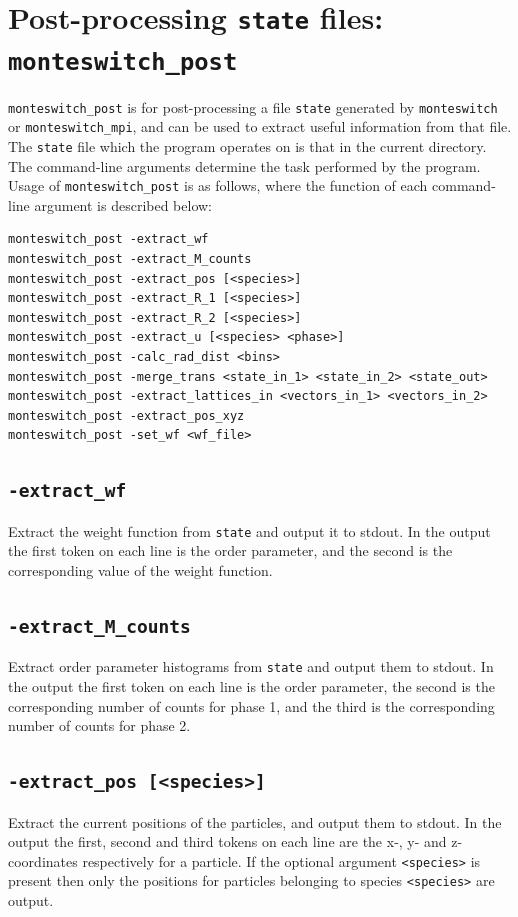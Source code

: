 \documentclass{report}
\begin{document}
\section{Post-processing \texttt{state} files: \texttt{monteswitch\_post}}\label{sec:monteswitch_post}
\texttt{monteswitch\_post} is for post-processing a file \texttt{state} generated by \texttt{monteswitch} or \texttt{monteswitch\_mpi}, and can
be used to extract useful information from that file. The \texttt{state} file which the program operates on is that in the current directory.
The command-line arguments determine the task performed by the program. Usage of \texttt{monteswitch\_post} is as follows, where the function 
of each command-line argument is described below:
\begin{verbatim}
monteswitch_post -extract_wf
monteswitch_post -extract_M_counts
monteswitch_post -extract_pos [<species>]
monteswitch_post -extract_R_1 [<species>]
monteswitch_post -extract_R_2 [<species>]
monteswitch_post -extract_u [<species> <phase>]
monteswitch_post -calc_rad_dist <bins>
monteswitch_post -merge_trans <state_in_1> <state_in_2> <state_out>
monteswitch_post -extract_lattices_in <vectors_in_1> <vectors_in_2>
monteswitch_post -extract_pos_xyz
monteswitch_post -set_wf <wf_file>
\end{verbatim}

\subsection{\texttt{-extract\_wf}}
Extract the weight function from \texttt{state} and output it to stdout. In the output the first token on each line is the order parameter, 
and the second is the corresponding value of the weight function.

\subsection{\texttt{-extract\_M\_counts}}
Extract order parameter histograms from \texttt{state} and output them to stdout. In the output the first token on each line is the order 
parameter, the second is the corresponding number of counts for phase 1, and the third is the corresponding number of counts for 
phase 2. 

\subsection{\texttt{-extract\_pos [<species>]}}
Extract the current positions of the particles, and output them to stdout. In the output the first, second and third tokens on each line 
are the x-, y- and z-coordinates respectively for a particle. If the optional argument \texttt{<species>} is present then only the positions
for particles belonging to species \texttt{<species>} are output.
\end{document}
